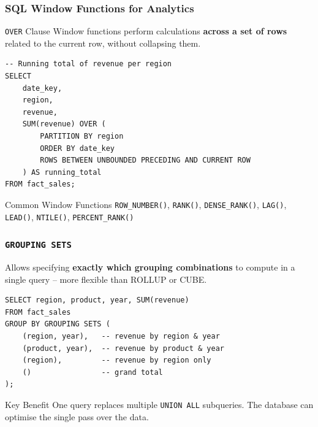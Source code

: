 \begin{frame}[fragile]
  \frametitle{SQL Window Functions for Analytics}

  \begin{block}{\texttt{OVER} Clause}
    Window functions perform calculations \textbf{across a set of rows}
    related to the current row, without collapsing them.
  \end{block}

  \begin{lstlisting}[style=sqlstyle]
-- Running total of revenue per region
SELECT
    date_key,
    region,
    revenue,
    SUM(revenue) OVER (
        PARTITION BY region
        ORDER BY date_key
        ROWS BETWEEN UNBOUNDED PRECEDING AND CURRENT ROW
    ) AS running_total
FROM fact_sales;
  \end{lstlisting}

  \begin{block}{Common Window Functions}
    \texttt{ROW\_NUMBER()}, \texttt{RANK()}, \texttt{DENSE\_RANK()},
    \texttt{LAG()}, \texttt{LEAD()}, \texttt{NTILE()}, \texttt{PERCENT\_RANK()}
  \end{block}

\end{frame}

\begin{frame}[fragile]
  \frametitle{\texttt{GROUPING SETS}}

  Allows specifying \textbf{exactly which grouping combinations} to compute
  in a single query -- more flexible than ROLLUP or CUBE.

  \begin{lstlisting}[style=sqlstyle]
SELECT region, product, year, SUM(revenue)
FROM fact_sales
GROUP BY GROUPING SETS (
    (region, year),   -- revenue by region & year
    (product, year),  -- revenue by product & year
    (region),         -- revenue by region only
    ()                -- grand total
);
  \end{lstlisting}

  \begin{block}{Key Benefit}
    One query replaces multiple \texttt{UNION ALL} subqueries.
    The database can optimise the single pass over the data.
  \end{block}

\end{frame}



